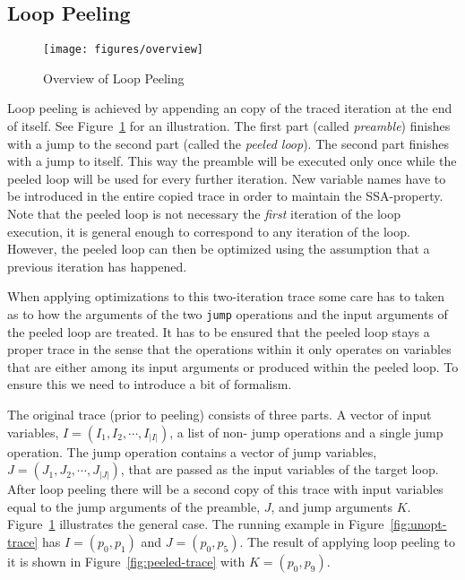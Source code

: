 \documentclass[preprint]{sigplanconf}
\begin{document}
\subsection{Loop Peeling}

\begin{figure}
\begin{center}
\texttt{[image: figures/overview]}
\end{center}
\caption{Overview of Loop Peeling}
\label{fig:overview}
\end{figure}

Loop peeling is achieved by appending an copy of the traced iteration at
the end of itself. See Figure~\ref{fig:overview} for an illustration.
The first part (called \emph{preamble}) finishes with a jump to the second part
(called the \emph{peeled loop}). The second part finishes with a jump to itself. This way
the preamble will be executed only once while the peeled loop will
be used for every further iteration. New variable names have to be
introduced in the entire copied trace in order to maintain the SSA-property.
Note that the peeled loop is not necessary the \emph{first} iteration of the
loop execution, it is general enough to correspond to any iteration of the loop.
However, the peeled loop can then be optimized using the assumption that a
previous iteration has happened.


When applying optimizations to this two-iteration trace
some care has to taken as to how the arguments of the two
\lstinline{jump} operations and the input arguments of the peeled loop are
treated. It has to be ensured that the peeled loop stays a proper
trace in the sense that the operations within it only operates on
variables that are either among its input arguments 
or produced within the peeled loop. To ensure this we need
to introduce a bit of formalism.

The original trace (prior to peeling) consists of three parts.
A vector of input
variables, $I=\left(I_1, I_2, \cdots, I_{|I|}\right)$, a list of non-
jump operations and a single
jump operation. The jump operation contains a vector of jump variables,
$J=\left(J_1, J_2, \cdots, J_{|J|}\right)$, that are passed as the input variables of the target loop. After
loop peeling there will be a second copy of this trace with input
variables equal to the jump arguments of the preamble, $J$, and jump
arguments $K$. 
Figure~\ref{fig:overview} illustrates the general case. The running
example in Figure~\ref{fig:unopt-trace} has  $I = \left( p_0, p_1
\right)$ and $J = \left( p_0, p_5 \right)$. The result of applying
loop peeling to it is shown in Figure~\ref{fig:peeled-trace} with 
$K = \left( p_0, p_9 \right)$. 
\end{document}
